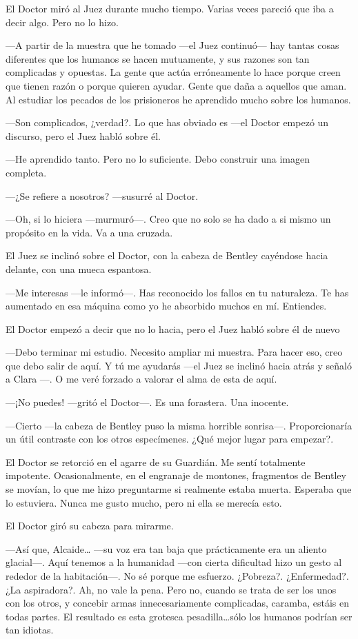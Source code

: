 El Doctor miró al Juez durante mucho tiempo. Varias veces pareció que
iba a decir algo. Pero no lo hizo.

---A partir de la muestra que he tomado ---el Juez continuó--- hay
tantas cosas diferentes que los humanos se hacen mutuamente, y sus
razones son tan complicadas y opuestas. La gente que actúa erróneamente
lo hace porque creen que tienen razón o porque quieren ayudar. Gente que
daña a aquellos que aman. Al estudiar los pecados de los prisioneros he
aprendido mucho sobre los humanos.

---Son complicados, ¿verdad?. Lo que has obviado es ---el Doctor empezó
un discurso, pero el Juez habló sobre él.

---He aprendido tanto. Pero no lo suficiente. Debo construir una imagen
completa.

---¿Se refiere a nosotros? ---susurré al Doctor.

---Oh, si lo hiciera ---murmuró---. Creo que no solo se ha dado a si
mismo un propósito en la vida. Va a una cruzada.

El Juez se inclinó sobre el Doctor, con la cabeza de Bentley cayéndose
hacia delante, con una mueca espantosa.

---Me interesas ---le informó---. Has reconocido los fallos en tu
naturaleza. Te has aumentado en esa máquina como yo he absorbido muchos
en mí. Entiendes.

El Doctor empezó a decir que no lo hacia, pero el Juez habló sobre él de
nuevo

---Debo terminar mi estudio. Necesito ampliar mi muestra. Para hacer
eso, creo que debo salir de aquí. Y tú me ayudarás ---el Juez se inclinó
hacia atrás y señaló a Clara ---. O me veré forzado a valorar el alma de
esta de aquí.

---¡No puedes! ---gritó el Doctor---. Es una forastera. Una inocente.

---Cierto ---la cabeza de Bentley puso la misma horrible sonrisa---.
Proporcionaría un útil contraste con los otros especímenes. ¿Qué mejor
lugar para empezar?.

El Doctor se retorció en el agarre de su Guardián. Me sentí totalmente
impotente. Ocasionalmente, en el engranaje de montones, fragmentos de
Bentley se movían, lo que me hizo preguntarme si realmente estaba
muerta. Esperaba que lo estuviera. Nunca me gusto mucho, pero ni ella se
merecía esto.

El Doctor giró su cabeza para mirarme.

---Así que, Alcaide\ldots{} ---su voz era tan baja que prácticamente era
un aliento glacial---. Aquí tenemos a la humanidad ---con cierta
dificultad hizo un gesto al rededor de la habitación---. No sé porque me
esfuerzo. ¿Pobreza?. ¿Enfermedad?. ¿La aspiradora?. Ah, no vale la pena.
Pero no, cuando se trata de ser los unos con los otros, y concebir armas
innecesariamente complicadas, caramba, estáis en todas partes. El
resultado es esta grotesca pesadilla\ldots{}sólo los humanos podrían ser
tan idiotas.

